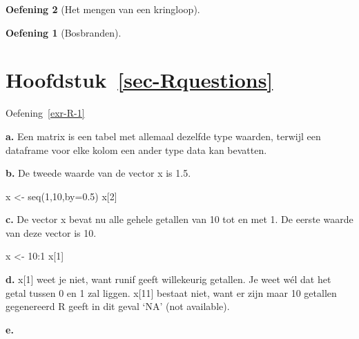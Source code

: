 \documentclass[
  a4paper,
]{scrbook}
\newenvironment{Shaded}{\begin{snugshade}}{\end{snugshade}}
\newcommand{\AttributeTok}[1]{\textcolor[rgb]{0.40,0.45,0.13}{#1}}
\newcommand{\DecValTok}[1]{\textcolor[rgb]{0.68,0.00,0.00}{#1}}
\newcommand{\FloatTok}[1]{\textcolor[rgb]{0.68,0.00,0.00}{#1}}
\newcommand{\FunctionTok}[1]{\textcolor[rgb]{0.28,0.35,0.67}{#1}}
\newcommand{\NormalTok}[1]{\textcolor[rgb]{0.00,0.23,0.31}{#1}}
\newcommand{\OtherTok}[1]{\textcolor[rgb]{0.00,0.23,0.31}{#1}}
\newcommand{\SpecialCharTok}[1]{\textcolor[rgb]{0.37,0.37,0.37}{#1}}
\theoremstyle{definition}
\newtheorem{exercise}{Oefening}[chapter]
\theoremstyle{remark}
\begin{document}
\begin{exercise}[Het mengen van een
kringloop]
\begin{exercise}[Bosbranden]
\section*{\texorpdfstring{Hoofdstuk~\ref{sec-Rquestions}}{Hoofdstuk~}}\label{sec-rquestions}


Oefening~\ref{exr-R-1}

\textbf{a.} Een matrix is een tabel met allemaal dezelfde type waarden,
terwijl een dataframe voor elke kolom een ander type data kan bevatten.

\textbf{b.} De tweede waarde van de vector x is 1.5.

\begin{Shaded}
\begin{Highlighting}[]
\NormalTok{x }\OtherTok{\textless{}{-}} \FunctionTok{seq}\NormalTok{(}\DecValTok{1}\NormalTok{,}\DecValTok{10}\NormalTok{,}\AttributeTok{by=}\FloatTok{0.5}\NormalTok{)}
\NormalTok{x[}\DecValTok{2}\NormalTok{]}
\end{Highlighting}
\end{Shaded}

\textbf{c.} De vector x bevat nu alle gehele getallen van 10 tot en met
1. De eerste waarde van deze vector is 10.

\begin{Shaded}
\begin{Highlighting}[]
\NormalTok{x }\OtherTok{\textless{}{-}} \DecValTok{10}\SpecialCharTok{:}\DecValTok{1}
\NormalTok{x[}\DecValTok{1}\NormalTok{] }
\end{Highlighting}
\end{Shaded}

\textbf{d.} x{[}1{]} weet je niet, want runif geeft willekeurig
getallen. Je weet wél dat het getal tussen 0 en 1 zal liggen. x{[}11{]}
bestaat niet, want er zijn maar 10 getallen gegenereerd R geeft in dit
geval `NA' (not available).

\textbf{e.}

\begin{Shaded}
\end{Shaded}


\end{exercise}
\end{exercise}
\end{document}
